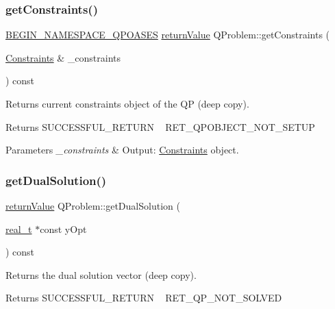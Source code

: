 \subsubsection{\texorpdfstring{get\+Constraints()}{getConstraints()}}
{\footnotesize\ttfamily \hyperlink{_types_8hpp_afd127fcb3c8f47975e9fa0ec2bacde52}{B\+E\+G\+I\+N\+\_\+\+N\+A\+M\+E\+S\+P\+A\+C\+E\+\_\+\+Q\+P\+O\+A\+S\+ES} \hyperlink{_message_handling_8hpp_a81d556f613bfbabd0b1f9488c0fa865e}{return\+Value} Q\+Problem\+::get\+Constraints (\begin{DoxyParamCaption}\item[{\hyperlink{class_constraints}{Constraints} \&}]{\+\_\+constraints }\end{DoxyParamCaption}) const\hspace{0.3cm}{\ttfamily [inline]}}

Returns current constraints object of the QP (deep copy). \begin{DoxyReturn}{Returns}
S\+U\+C\+C\+E\+S\+S\+F\+U\+L\+\_\+\+R\+E\+T\+U\+RN ~\newline
 R\+E\+T\+\_\+\+Q\+P\+O\+B\+J\+E\+C\+T\+\_\+\+N\+O\+T\+\_\+\+S\+E\+T\+UP 
\end{DoxyReturn}

\begin{DoxyParams}{Parameters}
{\em \+\_\+constraints} & Output\+: \hyperlink{class_constraints}{Constraints} object. \\
\hline
\end{DoxyParams}
\mbox{\label{class_q_problem_ae58420046e14b4b252c6833e2bd09b09}} 
\subsubsection{\texorpdfstring{get\+Dual\+Solution()}{getDualSolution()}}
{\footnotesize\ttfamily \hyperlink{_message_handling_8hpp_a81d556f613bfbabd0b1f9488c0fa865e}{return\+Value} Q\+Problem\+::get\+Dual\+Solution (\begin{DoxyParamCaption}\item[{\hyperlink{qp_o_a_s_e_s__wrapper_8h_a0d00e2b3dfadee81331bbb39068570c4}{real\+\_\+t} $\ast$const}]{y\+Opt }\end{DoxyParamCaption}) const\hspace{0.3cm}{\ttfamily [virtual]}}

Returns the dual solution vector (deep copy). \begin{DoxyReturn}{Returns}
S\+U\+C\+C\+E\+S\+S\+F\+U\+L\+\_\+\+R\+E\+T\+U\+RN ~\newline
 R\+E\+T\+\_\+\+Q\+P\+\_\+\+N\+O\+T\+\_\+\+S\+O\+L\+V\+ED 
\end{DoxyReturn}

